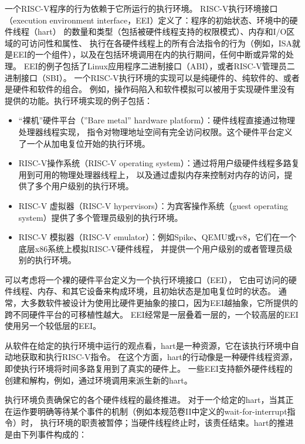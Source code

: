 一个RISC-V程序的行为依赖于它所运行的执行环境。
RISC-V执行环境接口（execution environment interface，EEI）定义了：程序的初始状态、环境中的硬件线程（hart）
的数量和类型（包括被硬件线程支持的权限模式）、内存和I/O区域的可访问性和属性、
执行在各硬件线程上的所有合法指令的行为（例如，ISA就是EEI的一个组件），以及在包括环境调用在内的执行期间，任何中断或异常的处理。
EEI的例子包括了Linux应用程序二进制接口（ABI），或者RISC-V管理员二进制接口（SBI）。
一个RISC-V执行环境的实现可以是纯硬件的、纯软件的、或者是硬件和软件的组合。
例如，操作码陷入和软件模拟可以被用于实现硬件里没有提供的功能。执行环境实现的例子包括：


\begin{itemize}
  \item “裸机”硬件平台（''Bare metal'' hardware platform）：硬件线程直接通过物理处理器线程实现，
  指令对物理地址空间有完全访问权限。这个硬件平台定义了一个从加电复位开始的执行环境。

  \item RISC-V操作系统（RISC-V operating system）：通过将用户级硬件线程多路复用到可用的物理处理器线程上，
  以及通过虚拟内存来控制对内存的访问，提供了多个用户级别的执行环境。

  \item RISC-V 虚拟器（RISC-V hypervisors）：为宾客操作系统（guest operating system）提供了多个管理员级别的执行环境。 

  \item RISC-V 模拟器（RISC-V emulator）：例如Spike、QEMU或rv8，它们在一个底层x86系统上模拟RISC-V硬件线程，
  并提供一个用户级别的或者管理员级别的执行环境。

\end{itemize}

\begin{commentary}
  可以考虑将一个裸的硬件平台定义为一个执行环境接口（EEI），
  它由可访问的硬件线程、内存、和其它设备来构成环境，且初始状态是加电复位时的状态。
  通常，大多数软件被设计为使用比硬件更抽象的接口，因为EEI越抽象，它所提供的跨不同硬件平台的可移植性越大。
  EEI经常是一层叠着一层的，一个较高层的EEI使用另一个较低层的EEI。
\end{commentary}

从软件在给定的执行环境中运行的观点看，hart是一种资源，它在该执行环境中自动地获取和执行RISC-V指令。
在这个方面，hart的行动像是一种硬件线程资源，即使执行环境将时间多路复用到了真实的硬件上。
一些EEI支持额外硬件线程的创建和解构，例如，通过环境调用来派生新的hart。

执行环境负责确保它的各个硬件线程的最终推进。
对于一个给定的hart，当其正在运作要明确等待某个事件的机制（例如本规范卷II中定义的wait-for-interrupt指令）时，
执行环境的职责被暂停；当硬件线程终止时，该责任结束。hart的推进是由下列事件构成的：

